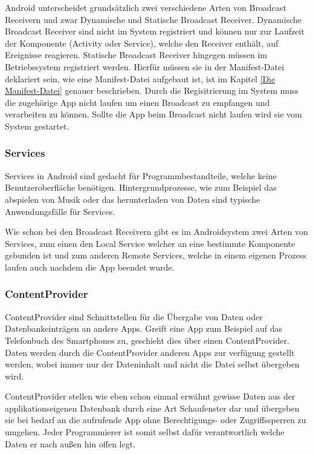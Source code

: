 Android unterscheidet grunds\"atzlich zwei verschiedene Arten von Broadcast Receivern und zwar Dynamische und Statische Broadcast Receiver. Dynamische Broadcast Receiver sind nicht im System registriert und k\"onnen nur zur Laufzeit der Komponente (Activity oder Service), welche den Receiver enth\"alt, auf Ereignisse reagieren. Statische Broadcast Receiver hingegen m\"ussen im Betriebssystem registriert werden. Hierf\"ur m\"ussen sie in der Manifest-Datei deklariert sein, wie eine Manifest-Datei aufgebaut ist, ist im Kapitel \ref{Die Manifest-Datei} genauer beschrieben. Durch die Regisitrierung im System muss die zugeh\"orige App nicht laufen um einen Broadcast zu empfangen und verarbeiten zu k\"onnen. Sollte die App beim Broadcast nicht laufen wird sie vom System gestartet.

\subsubsection{Services} \label{Services aus Nutzersicht}
Services in Android sind gedacht f\"ur Programmbestandteile, welche keine Benutzeroberfl\"ache ben\"otigen. Hintergrundprozesse, wie zum Beispiel das abspielen von Musik oder das herunterladen von Daten sind typische Anwendungsf\"alle f\"ur Services. 

Wie schon bei den Broadcast Receivern gibt es im Androidsystem zwei Arten von Services, zum einen den Local Service welcher an eine bestimmte Komponente gebunden ist und zum anderen  Remote Services, welche in einem eigenen Prozess laufen auch nachdem die App beendet wurde.

\subsubsection{ContentProvider} \label{ContentProvider aus Nutzersicht}
ContentProvider sind Schnittstellen f\"ur die \"Ubergabe von Daten oder Datenbankeintr\"agen an andere Apps.
Greift eine App zum Beispiel auf das Telefonbuch des Smartphones zu, geschieht dies \"uber einen ContentProvider. Daten werden durch die ContentProvider anderen Apps zur verf\"ugung gestellt werden, wobei immer nur der Dateninhalt und nicht die Datei selbst \"ubergeben wird. \cite{Kuehn12}

ContentProvider stellen wie eben schon einmal erw\"ahnt gewisse Daten aus der applikationseigenen Datenbank durch eine Art Schaufenster dar und \"ubergeben sie bei bedarf an die aufrufende App ohne Berechtigungs- oder Zugriffssperren zu umgehen. Jeder Programmierer ist somit selbst daf\"ur verantwortlich welche Daten er nach au\ss{}en hin offen legt.

